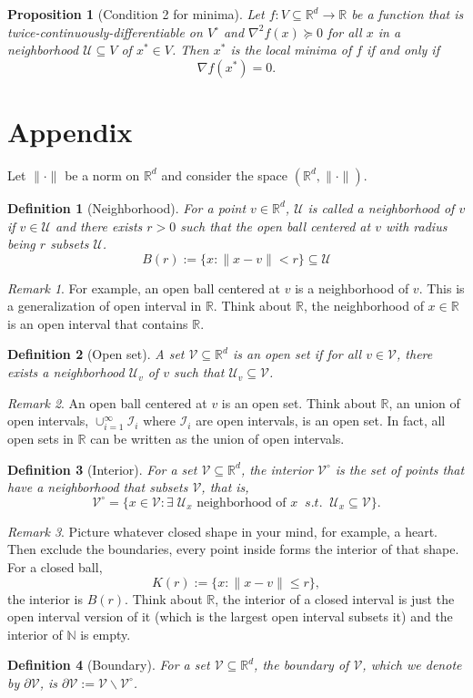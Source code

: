 \documentclass{article}
\newtheorem{definition}{Definition}
\newtheorem{proposition}{Proposition}
\newcommand{\R}{\mathbb{R}}
\newcommand{\N}{\mathbb{N}}
\DeclareMathOperator*{\1}{\mathbbm{1}}
\theoremstyle{definition}
\theoremstyle{remark}
\newtheorem{remark}{Remark}
\newcommand{\cU}{\mathcal{U}}
\newcommand{\cV}{\mathcal{V}}
\newcommand{\cI}{\mathcal{I}}
\begin{document}
  \begin{proposition}[Condition 2 for minima]
    Let $f:V\subseteq \R^d \to \R$ be a function that is twice-continuously-differentiable on $V^\circ$ and $\nabla^2 f(x)\succeq 0$ for all $x$ in a neighborhood $\cU\subseteq V$ of $x^*\in V$. Then $x^*$ is the local minima of $f$ if and only if 
    \begin{equation*}
      \nabla f(x^*)=0.
    \end{equation*}
  \end{proposition}
  \section{Appendix}
  Let $\|\cdot\|$ be a norm on $\R^d$ and consider the space $(\R^d, \|\cdot\|)$. 
  \begin{definition}[Neighborhood]
    For a point $v\in \R^d$, $\cU$ is called a neighborhood of $v$ if $v\in \cU$ and there exists $r>0$ such that the open ball centered at $v$ with radius being $r$ subsets $\cU$. 
  \[B(r):=\{x:\|x-v\|<r\}\subseteq \cU\]
  \end{definition}
  \begin{remark}
    For example, an open ball centered at $v$ is a neighborhood of $v$. This is a generalization of open interval in $\R$. Think about $\R$, the neighborhood of $x\in \R$ is an open interval that contains $\R$.
  \end{remark}
  \begin{definition}[Open set]
    A set $\cV\subseteq \R^d$ is an open set if for all $v\in \cV$, there exists a neighborhood $\cU_v$ of $v$ such that $\cU_v\subseteq \cV$.
  \end{definition}
  \begin{remark}
    An open ball centered at $v$ is an open set. Think about $\R$, an union of open intervals, $\cup_{i=1}^\infty \cI_i$ where $\cI_i$ are open intervals, is an open set. In fact, all open sets in $\R$ can be written as the union of open intervals.
  \end{remark}
  \begin{definition}[Interior]
    For a set $\cV\subseteq\R^d$, the interior $\cV^\circ$ is the set of points that have a neighborhood that subsets $\cV$, that is,
    \[\cV^\circ = \{x\in \cV: \exists 
    \;\cU_x \text{ neighborhood of }x \;\; s.t. \;\;\cU_x\subseteq\cV\}.\]
  \end{definition} 
  \begin{remark}
    Picture whatever closed shape in your mind, for example, a heart. Then exclude the boundaries, every point inside forms the interior of that shape. For a closed ball, \[K(r):=\{x:\|x-v\|\le r\},\]
    the interior is $B(r)$. Think about $\R$, the interior of a closed interval is just the open interval version of it (which is the largest open interval subsets it) and the interior of $\N$ is empty.
  \end{remark}

  \begin{definition}[Boundary]
    For a set $\cV\subseteq\R^d$, the boundary of $\cV$, which we denote by $\partial \cV$, is $\partial \cV := \cV\backslash \cV^\circ$.
  \end{definition}

  
\end{document}
